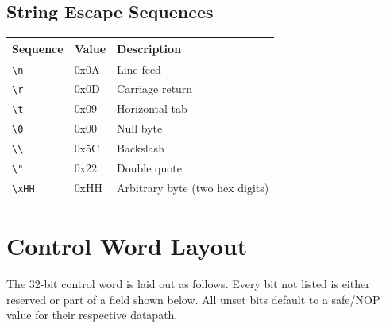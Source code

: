 \documentclass[a4paper,12pt]{report}
\begin{document}
\section{String Escape Sequences}

\begin{tabularx}{\linewidth}{llX}
\toprule
\textbf{Sequence} & \textbf{Value} & \textbf{Description} \\
\midrule
\texttt{{\textbackslash}n}    & 0x0A & Line feed \\
\texttt{{\textbackslash}r}    & 0x0D & Carriage return \\
\texttt{{\textbackslash}t}    & 0x09 & Horizontal tab \\
\texttt{{\textbackslash}0}    & 0x00 & Null byte \\
\texttt{{\textbackslash}{\textbackslash}} & 0x5C & Backslash \\
\texttt{{\textbackslash}"}    & 0x22 & Double quote \\
\texttt{{\textbackslash}xHH}  & 0xHH & Arbitrary byte (two hex digits) \\
\bottomrule
\end{tabularx}

\chapter{Control Word Layout}
\label{app:cwlayout}

The 32-bit control word is laid out as follows. Every bit not listed is either reserved or part of a field shown below. All unset bits default to a safe/NOP value for their respective datapath.
\end{document}
